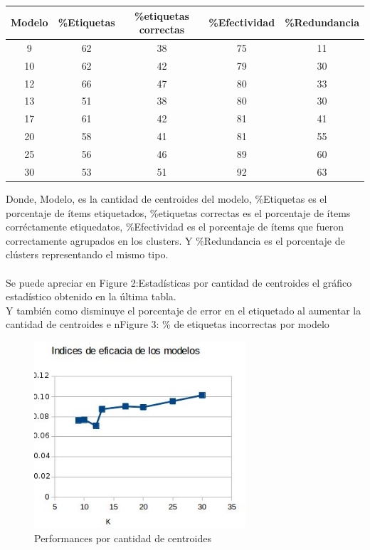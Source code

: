 \begin{tabular}{| c | c | c | c | c |}\hline
Modelo & \%Etiquetas & \%etiquetas correctas & \%Efectividad & \%Redundancia\\ \hline
9 & 62 & 38 & 75 & 11\\
10 & 62 & 42 & 79 & 30\\
12 & 66 & 47 & 80 & 33\\
13 & 51 & 38 & 80 & 30\\
17 & 61 & 42 & 81 & 41\\
20 & 58 & 41 & 81 & 55\\
25 & 56 & 46 & 89 & 60\\
30 & 53 & 51 & 92 & 63\\ \hline
\end{tabular}

Donde, Modelo, es la cantidad de centroides del modelo, \%Etiquetas es el porcentaje de ítems etiquetados, \%etiquetas correctas es el porcentaje 
de ítems corréctamente etiquedatos, \%Efectividad es el porcentaje de ítems que fueron correctamente agrupados en los clusters. Y \%Redundancia 
es el porcentaje de clústers representando el mismo tipo.\\
\\
Se puede apreciar en Figure 2:Estadísticas por cantidad de centroides el gráfico estadístico obtenido en la última tabla.\\
Y también como disminuye el porcentaje de error en el etiquetado al aumentar la cantidad de centroides e nFigure 3: \% de etiquetas incorrectas por modelo
\begin{figure}
  \centering
    \includegraphics[width=0.7\textwidth]{chart1}
  \caption{Performances por cantidad de centroides}
  \label{fig:ejemplo}
\end{figure}
